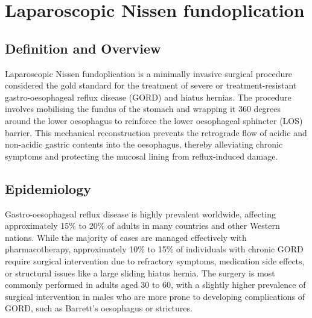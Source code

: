 \chapter{Laparoscopic Nissen fundoplication}

\section*{Definition and Overview}
Laparoscopic Nissen fundoplication is a minimally invasive surgical procedure considered the gold standard for the treatment of severe or treatment-resistant gastro-oesophageal reflux disease (GORD) and hiatus hernias. The procedure involves mobilising the fundus of the stomach and wrapping it 360 degrees around the lower oesophagus to reinforce the lower oesophageal sphincter (LOS) barrier. This mechanical reconstruction prevents the retrograde flow of acidic and non-acidic gastric contents into the oesophagus, thereby alleviating chronic symptoms and protecting the mucosal lining from reflux-induced damage.

\section*{Epidemiology}
Gastro-oesophageal reflux disease is highly prevalent worldwide, affecting approximately 15\% to 20\% of adults in many countries and other Western nations. While the majority of cases are managed effectively with pharmacotherapy, approximately 10\% to 15\% of individuals with chronic GORD require surgical intervention due to refractory symptoms, medication side effects, or structural issues like a large sliding hiatus hernia. The surgery is most commonly performed in adults aged 30 to 60, with a slightly higher prevalence of surgical intervention in males who are more prone to developing complications of GORD, such as Barrett's oesophagus or strictures.

